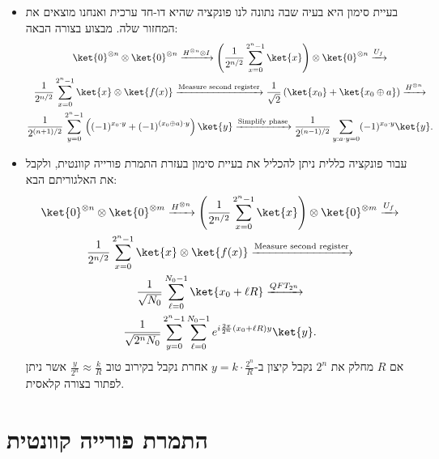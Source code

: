 \documentclass{tstextbook}
\begin{document}
\begin{summary}
  \begin{itemize}
    \item בעיית סימון היא בעיה שבה נתונה לנו פונקציה שהיא דו-חד ערכית ואנחנו מוצאים את המחזור שלה. מבצוע בצורה הבאה:
\begin{gather*}\ket{0}^{\otimes n} \otimes \ket{0}^{\otimes n} \xrightarrow{H^{\otimes n} \otimes I} \left( \frac{1}{2^{n/2}} \sum_{x=0}^{2^n - 1} \ket{x} \right) \otimes \ket{0}^{\otimes n} \xrightarrow{U_f}  \\\frac{1}{2^{n/2}} \sum_{x=0}^{2^n - 1} \ket{x} \otimes \ket{f(x)} \xrightarrow{\text{Measure second register}} \frac{1}{\sqrt{2}} \left( \ket{x_0} + \ket{x_0 \oplus a} \right) \xrightarrow{H^{\otimes n}}  \\\frac{1}{2^{(n+1)/2}} \sum_{y=0}^{2^n - 1} \left( (-1)^{x_0 \cdot y} + (-1)^{(x_0 \oplus a) \cdot y} \right) \ket{y} \xrightarrow{\text{Simplify phase}} \frac{1}{2^{(n-1)/2}} \sum_{y: a \cdot y = 0} (-1)^{x_0 \cdot y} \ket{y}.
\end{gather*}
    \item עבור פונקציה כללית ניתן להכליל את בעיית סימון בעזרת התמרת פורייה קוונטית, ולקבל את האלגוריתם הבא:
\begin{gather*}\ket{0}^{\otimes n} \otimes \ket{0}^{\otimes m}  \xrightarrow{H^{\otimes n}}   \left( \frac{1}{2^{n/2}} \sum_{x=0}^{2^n - 1} \ket{x} \right) \otimes \ket{0}^{\otimes m}  \xrightarrow{U_f}  \\ \frac{1}{2^{n/2}} \sum_{x=0}^{2^n - 1} \ket{x} \otimes \ket{f(x)}  \xrightarrow{\text{Measure second register}}  \\ \frac{1}{\sqrt{N_0}} \sum_{\ell=0}^{N_0 - 1} \ket{x_0 + \ell R}  \xrightarrow{QFT_{2^n}}  \\ \frac{1}{\sqrt{2^n N_0}} \sum_{y=0}^{2^n - 1} \sum_{\ell=0}^{N_0 - 1} e^{i \frac{2\pi}{2^n} (x_0 + \ell R) y} \ket{y}. 
\end{gather*}
אם \(R\) מחלק את \(2^{n}\) נקבל קיצון ב-\(y=k\cdot \frac{2^{n}}{R}\) אחרת נקבל בקירוב טוב \(\frac{y}{2^{n}}\approx \frac{k}{R}\) אשר ניתן לפתור בצורה קלאסית.
  \end{itemize}
\end{summary}
\section{התמרת פורייה קוונטית}
\end{document}
